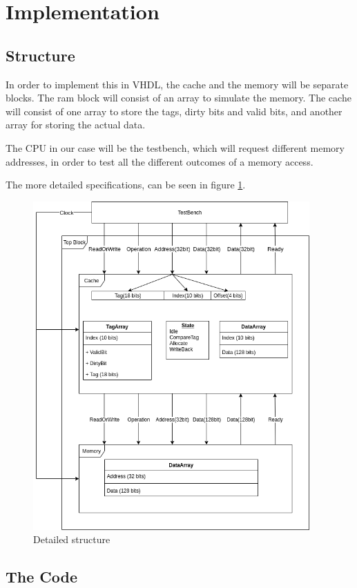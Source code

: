 \documentclass{article}
\begin{document}
\section{Implementation}
\subsection{Structure}
In order to implement this in VHDL, the cache and the memory will be separate blocks. The ram block will consist of an array to simulate the memory. The cache will consist of one array to store the tags, dirty bits and valid bits, and another array for storing the actual data. 

The CPU in our case will be the testbench, which will request different memory addresses, in order to test all the different outcomes of a memory access. 

The more detailed specifications, can be seen in figure \ref{DETAILED}.

\begin{figure}[H]
 \centering
  \includegraphics[width=300pt]{img/OverviewDetailed.png}
 \caption{Detailed structure}
  \label{DETAILED}
 \end{figure}

\subsection{The Code}
\end{document}
